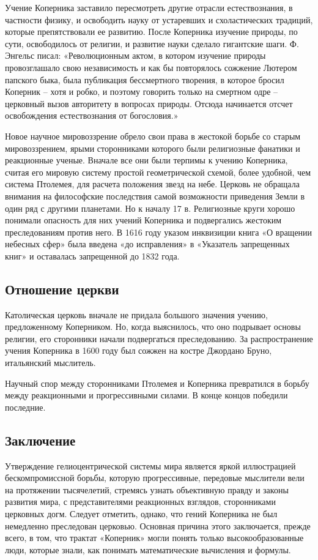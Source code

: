 \documentclass[a4paper, 14pt]{extreport}
\begin{document}
Учение Коперника заставило пересмотреть другие отрасли естествознания, в
частности физику, и освободить науку от устаревших и схоластических
традиций, которые препятствовали ее развитию. После Коперника изучение
природы, по сути, освободилось от религии, и развитие науки сделало
гигантские шаги. Ф. Энгельс писал: «Революционным актом, в котором
изучение природы провозглашало свою независимость и как бы повторялось
сожжение Лютером папского быка, была публикация бессмертного творения, в
которое бросил Коперник -- хотя и робко, и поэтому говорить только на
смертном одре -- церковный вызов авторитету в вопросах природы. Отсюда
начинается отсчет освобождения естествознания от богословия.»

Новое научное мировоззрение обрело свои права в жестокой борьбе со
старым мировоззрением, ярыми сторонниками которого были религиозные
фанатики и реакционные ученые. Вначале все они были терпимы к учению
Коперника, считая его мировую систему простой геометрической схемой,
более удобной, чем система Птолемея, для расчета положения звезд на
небе. Церковь не обращала внимания на философские последствия самой
возможности приведения Земли в один ряд с другими планетами. Но к началу
17 в. Религиозные круги хорошо понимали опасность для них учений
Коперника и подвергались жестоким преследованиям против него. В 1616
году указом инквизиции книга «О вращении небесных сфер» была введена «до
исправления» в «Указатель запрещенных книг» и оставалась запрещенной до
1832 года.

\subsection{Отношение церкви}

Католическая церковь вначале не придала большого значения учению,
предложенному Коперником. Но, когда выяснилось, что оно подрывает основы
религии, его сторонники начали подвергаться преследованию. За
распространение учения Коперника в 1600 году был сожжен на костре
Джордано Бруно, итальянский мыслитель.

Научный спор между сторонниками Птолемея и Коперника превратился в
борьбу между реакционными и прогрессивными силами. В конце концов
победили последние.

\subsection{Заключение}

Утверждение гелиоцентрической системы мира является яркой иллюстрацией
бескомпромиссной борьбы, которую прогрессивные, передовые мыслители вели
на протяжении тысячелетий, стремясь узнать объективную правду и законы
развития мира, с представителями реакционных взглядов, сторонниками
церковных догм. Следует отметить, однако, что гений Коперника не был
немедленно преследован церковью. Основная причина этого заключается,
прежде всего, в том, что трактат «Коперник» могли понять только
высокообразованные люди, которые знали, как понимать математические
вычисления и формулы.
\end{document}
